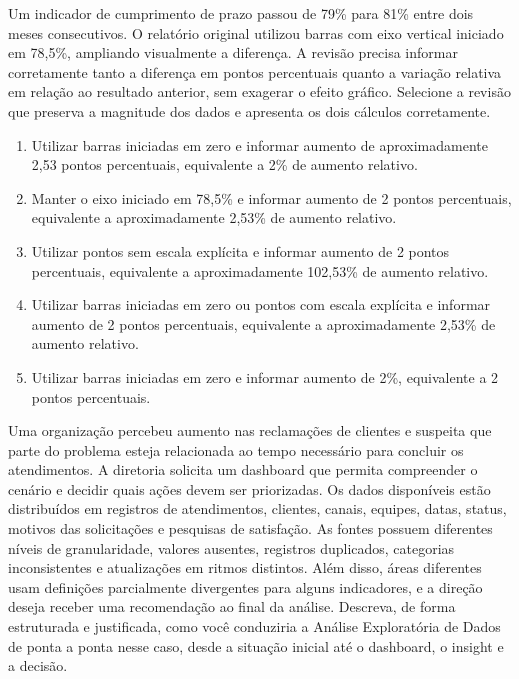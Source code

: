 \documentclass[12pt,a4paper]{article}
\begin{document}
\TextoBase
Um indicador de cumprimento de prazo passou de 79\% para 81\% entre dois meses consecutivos. O relatório original utilizou barras com eixo vertical iniciado em 78,5\%, ampliando visualmente a diferença. A revisão precisa informar corretamente tanto a diferença em pontos percentuais quanto a variação relativa em relação ao resultado anterior, sem exagerar o efeito gráfico.
\FonteDidatica
\Comando Selecione a revisão que preserva a magnitude dos dados e apresenta os dois cálculos corretamente.
\begin{enumerate}[label=\Alph*)]
\item Utilizar barras iniciadas em zero e informar aumento de aproximadamente 2,53 pontos percentuais, equivalente a 2\% de aumento relativo.
\item Manter o eixo iniciado em 78,5\% e informar aumento de 2 pontos percentuais, equivalente a aproximadamente 2,53\% de aumento relativo.
\item Utilizar pontos sem escala explícita e informar aumento de 2 pontos percentuais, equivalente a aproximadamente 102,53\% de aumento relativo.
\item Utilizar barras iniciadas em zero ou pontos com escala explícita e informar aumento de 2 pontos percentuais, equivalente a aproximadamente 2,53\% de aumento relativo.
\item Utilizar barras iniciadas em zero e informar aumento de 2\%, equivalente a 2 pontos percentuais.
\end{enumerate}

\TextoBase
Uma organização percebeu aumento nas reclamações de clientes e suspeita que parte do problema esteja relacionada ao tempo necessário para concluir os atendimentos. A diretoria solicita um dashboard que permita compreender o cenário e decidir quais ações devem ser priorizadas. Os dados disponíveis estão distribuídos em registros de atendimentos, clientes, canais, equipes, datas, status, motivos das solicitações e pesquisas de satisfação. As fontes possuem diferentes níveis de granularidade, valores ausentes, registros duplicados, categorias inconsistentes e atualizações em ritmos distintos. Além disso, áreas diferentes usam definições parcialmente divergentes para alguns indicadores, e a direção deseja receber uma recomendação ao final da análise.
\FonteDidatica
\Comando Descreva, de forma estruturada e justificada, como você conduziria a Análise Exploratória de Dados de ponta a ponta nesse caso, desde a situação inicial até o dashboard, o insight e a decisão.
\EspacoDiscursivaFinal
\end{document}
